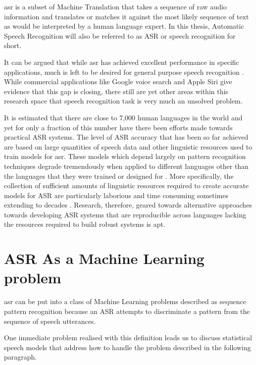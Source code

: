 \acrfull{asr} is a subset of Machine Translation that takes a sequence of raw audio information and translates or matches it against the most likely sequence of text as would be interpreted by a human language expert.  In this thesis, Automatic Speech Recognition will also be referred to as 
ASR or speech recognition for short.

It can be argued that while \acrshort{asr} has achieved excellent performance in specific applications, much is left to be desired for general purpose speech recognition \citep{yu2016automatic}. While commercial applications like Google voice search and Apple Siri give evidence that this gap is closing, there still are yet other areas within this research space that speech recognition task is very much an unsolved problem.

It is estimated that there are close to 7,000 human languages in the world \citep{besacier2014automatic} and yet for only a fraction of this number have there been efforts made towards practical ASR systems.  The level of ASR accuracy that has been so far achieved are based on large quantities of speech data and other linguistic resources used to train models for \acrshort{asr}. These models which depend largely on pattern recognition techniques degrade tremendously  when applied to different languages other than the languages that they were trained or designed for  \citep{Rosenberg2017end,besacier2014introduction}. More specifically, the collection of sufficient amounts of linguistic resources required to create accurate models for ASR are particularly laborious and time consuming sometimes extending to decades \citep{goldman2011easyalign,stan2016alisa}.  Research, therefore, geared towards alternative approaches towards developing ASR systems that are reproducible across languages lacking the resources required to build robust systems is apt.

\section{ASR As a Machine Learning  problem}\label{ASRMLP}
\pagestyle{plain}
\acrlong{asr} can be put into a class of Machine Learning problems described as sequence pattern recognition because an ASR attempts to discriminate a pattern from the sequence of speech utterances. 

One immediate problem realised with this definition leads us to discuss statistical speech models that address how to handle the problem described in the following paragraph.

